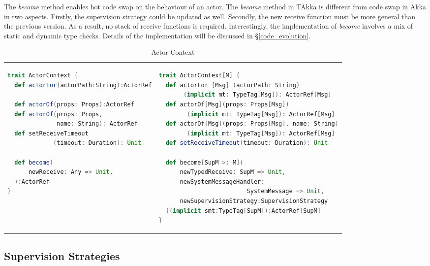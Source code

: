 The {\it become} method enables hot code swap on the behaviour of an actor.  The
{\it become} method in TAkka is different from code swap in Akka in two aspects.
 Firstly, the supervision strategy could be updated as well.  Secondly, the new
receive function must be more general than the previous version.  As a result,
no stack of receive functions is required.  Interestingly, the implementation of
{\it become} involves a mix of static and dynamic type checks.  Details of the
implementation will be discussed in \S\ref{code_evolution}.

\begin{table}[h]
\label{ActorContext}
   \begin{adjustwidth}{-1.3cm}{}
  \begin{tabular}{ l   l }
      \begin{lstlisting}[language=scala]
trait ActorContext {
  def actorFor(actorPath:String):ActorRef
  
  def actorOf(props: Props):ActorRef
  def actorOf(props: Props, 
              name: String): ActorRef
  def setReceiveTimeout
             (timeout: Duration): Unit

  def become(
      newReceive: Any => Unit,
  ):ActorRef
}



    \end{lstlisting}
&
    \begin{lstlisting}[language=scala]
trait ActorContext[M] {
  def actorFor [Msg] (actorPath: String)
       (implicit mt: TypeTag[Msg]): ActorRef[Msg]
  def actorOf[Msg](props: Props[Msg])
        (implicit mt: TypeTag[Msg]): ActorRef[Msg]
  def actorOf[Msg](props: Props[Msg], name: String)
        (implicit mt: TypeTag[Msg]): ActorRef[Msg]
  def setReceiveTimeout(timeout: Duration): Unit

  def become[SupM >: M](
      newTypedReceive: SupM => Unit,
      newSystemMessageHandler:
                         SystemMessage => Unit,
      newSupervisionStrategy:SupervisionStrategy
  )(implicit smt:TypeTag[SupM]):ActorRef[SupM]
}
    \end{lstlisting}
    \end{tabular}
     \end{adjustwidth}
    \caption{Actor Context}
\end{table}


\subsection{Supervision Strategies}
\label{supervision}


